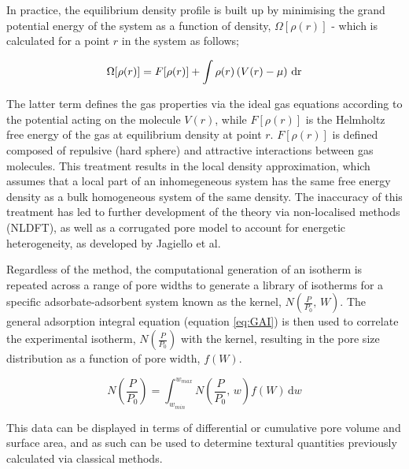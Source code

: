 In practice, the equilibrium density profile is built up by minimising the grand potential energy of the system as a function of density, $\Omega[\rho(r)]$ - which is calculated for a point $r$ in the system as follows;

\begin{equation}
\Omega[\rho(r)] = F[\rho(r)] + \int \rho(r)\left(V(r) - \mu\right) \,\rm{d}r
\end{equation}

The latter term defines the gas properties via the ideal gas equations according to the potential acting on the molecule $V(r)$, while $F[\rho(r)]$ is the Helmholtz free energy of the gas at equilibrium density at point $r$. $F[\rho(r)]$ is defined composed of repulsive (hard sphere) and attractive interactions between gas molecules. This treatment results in the local density approximation, which assumes that a local part of an inhomegeneous system has the same free energy density as a bulk homogeneous system of the same density. The inaccuracy of this treatment has led to further development of the theory via non-localised methods (NLDFT),  \citep{tarazona1987phase, lastoskie1993pore, landers2013density} 
as well as a corrugated pore model to account for energetic heterogeneity, as developed by Jagiello et al.\citep{Jagiello20132D}

Regardless of the method, the computational generation of an isotherm is repeated across a range of pore widths to generate a library of isotherms for a specific \gls{adsorbate}-\gls{adsorbent} system known as the kernel, $N\left(\frac{P}{P_0}, \, W\right)$. The general \gls{adsorption} integral equation (equation \ref{eq:GAI}) is then used to correlate the experimental isotherm, $N\left(\frac{P}{P_0}\right)$  with the kernel, resulting in the pore size distribution as a function of pore width, $f(W)$.\citep{Thommes2015Physisorption}

\begin{equation} \label{eq:GAI}
    N\left(\frac{P}{P_0}\right) = \int_{w_{min}}^{w_{max}} N\left(\frac{P}{P_0}, \, w \right) f(W) \, \mathrm{d}w
\end{equation}

This data can be displayed in terms of differential or cumulative pore volume and surface area, and as such can be used to determine textural quantities previously calculated via classical methods.


